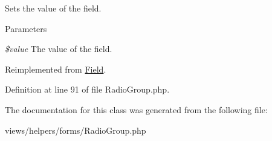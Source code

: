Sets the value of the field. 


\begin{DoxyParams}{Parameters}
\item[{\em \$value}]The value of the field. \end{DoxyParams}


Reimplemented from \hyperlink{class_field_a71850d0cc96eeb649e4e62b040c6fa97}{Field}.



Definition at line 91 of file RadioGroup.php.



The documentation for this class was generated from the following file:\begin{DoxyCompactItemize}
\item 
views/helpers/forms/RadioGroup.php\end{DoxyCompactItemize}
